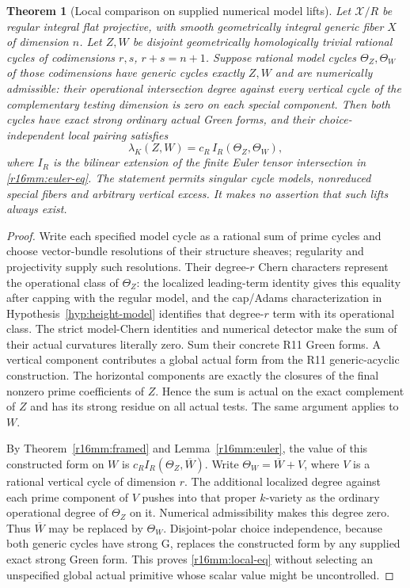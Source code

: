 \documentclass[11pt,a4paper]{article}
\newtheorem{theorem}{Theorem}[section]
\theoremstyle{definition}
\theoremstyle{remark}
\numberwithin{equation}{section}
\begin{document}
\begin{theorem}[Local comparison on supplied numerical model lifts]
\label{r16mm:local}
Let $\mathcal X/R$ be regular integral flat projective, with
smooth geometrically integral generic fiber $X$ of dimension
$n$. Let $Z,W$ be disjoint geometrically homologically trivial
rational cycles of codimensions $r,s$, $r+s=n+1$.
Suppose rational model cycles $\Theta_Z,\Theta_W$ of those
codimensions have generic cycles exactly $Z,W$ and are
numerically admissible: their operational intersection degree
against every vertical cycle of the complementary testing
dimension is zero on each special component. Then both cycles
have exact strong ordinary actual Green forms, and their
choice-independent local pairing satisfies
\[
 \lambda_K(Z,W)=c_R\,I_R(\Theta_Z,\Theta_W),
 \tag{MM16.9}\label{r16mm:local-eq}
\]
where $I_R$ is the bilinear extension of the finite Euler tensor
intersection in \eqref{r16mm:euler-eq}. The statement permits
singular cycle models, nonreduced special fibers and arbitrary
vertical excess. It makes no assertion that such lifts always
exist.
\end{theorem}

\begin{proof}
Write each specified model cycle as a rational sum of prime
cycles and choose vector-bundle resolutions of their structure
sheaves; regularity and projectivity supply such resolutions.
Their degree-$r$ Chern characters represent the operational
class of $\Theta_Z$: the localized leading-term identity gives
this equality after capping with the regular model, and the
cap/Adams characterization in Hypothesis~\ref{hyp:height-model} identifies that degree-$r$ term
with its operational class. The strict model-Chern identities and
numerical detector make the sum of their actual curvatures
literally zero. Sum their concrete R11 Green forms. A vertical
component contributes a global actual form from the R11
generic-acyclic construction. The horizontal components are
exactly the closures of the final nonzero prime coefficients
of $Z$. Hence the sum is actual on the exact complement of
$Z$ and has its strong residue on all actual tests. The same
argument applies to $W$.

By Theorem~\ref{r16mm:framed} and Lemma~\ref{r16mm:euler},
the value of this constructed form on $W$ is
$c_R I_R(\Theta_Z,\overline W)$.
Write $\Theta_W=\overline W+V$, where $V$ is a rational
vertical cycle of dimension $r$. The additional localized
degree against each prime component of $V$ pushes into that
proper $k$-variety as the ordinary operational degree of
$\Theta_Z$ on it. Numerical admissibility makes this degree
zero. Thus $\overline W$ may be replaced by $\Theta_W$.
Disjoint-polar choice independence, because both
generic cycles have strong G, replaces the constructed form
by any supplied exact strong Green form. This proves
\eqref{r16mm:local-eq} without selecting an unspecified global
actual primitive whose scalar value might be uncontrolled.
\end{proof}
\end{document}
